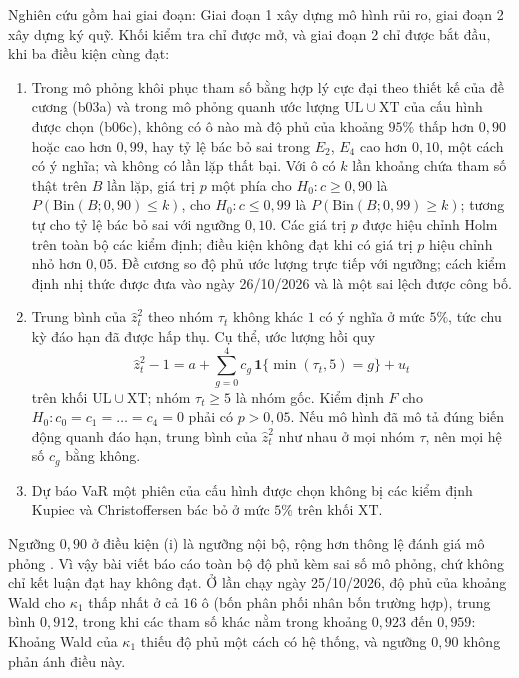 \documentclass[12pt,a4paper]{article}
\theoremstyle{definition}
\theoremstyle{remark}
\newcommand{\ind}{\mathbf{1}}
\newcommand{\UL}{\mathrm{UL}}
\newcommand{\XT}{\mathrm{XT}}
\begin{document}
Nghiên cứu gồm hai giai đoạn: Giai đoạn 1 xây dựng mô hình rủi ro, giai đoạn 2 xây dựng ký quỹ. Khối kiểm tra chỉ được mở, và giai đoạn 2 chỉ được bắt đầu, khi ba điều kiện cùng đạt:
\begin{enumerate}
\item[(i)] Trong mô phỏng khôi phục tham số bằng hợp lý cực đại theo thiết kế của đề cương (b03a) và trong mô phỏng quanh ước lượng $\UL\cup\XT$ của cấu hình được chọn (b06c), không có ô nào mà độ phủ của khoảng $95\%$ thấp hơn $0{,}90$ hoặc cao hơn $0{,}99$, hay tỷ lệ bác bỏ sai trong $E_2$, $E_4$ cao hơn $0{,}10$, một cách có ý nghĩa; và không có lần lặp thất bại. Với ô có $k$ lần khoảng chứa tham số thật trên $B$ lần lặp, giá trị $p$ một phía cho $H_0:c\ge0{,}90$ là $P(\mathrm{Bin}(B;0{,}90)\le k)$, cho $H_0:c\le0{,}99$ là $P(\mathrm{Bin}(B;0{,}99)\ge k)$; tương tự cho tỷ lệ bác bỏ sai với ngưỡng $0{,}10$. Các giá trị $p$ được hiệu chỉnh Holm trên toàn bộ các kiểm định; điều kiện không đạt khi có giá trị $p$ hiệu chỉnh nhỏ hơn $0{,}05$. Đề cương so độ phủ ước lượng trực tiếp với ngưỡng; cách kiểm định nhị thức được đưa vào ngày 26/10/2026 và là một sai lệch được công bố.
\item[(ii)] Trung bình của $\hat z_t^2$ theo nhóm $\tau_t$ không khác $1$ có ý nghĩa ở mức $5\%$, tức chu kỳ đáo hạn đã được hấp thụ. Cụ thể, ước lượng hồi quy
\begin{equation*}
\hat z_t^2-1=a+\sum_{g=0}^{4}c_g\,\ind\{\min(\tau_t,5)=g\}+u_t
\end{equation*}
trên khối $\UL\cup\XT$; nhóm $\tau_t\ge5$ là nhóm gốc. Kiểm định $F$ cho $H_0:c_0=c_1=\dots=c_4=0$ phải có $p>0{,}05$. Nếu mô hình đã mô tả đúng biến động quanh đáo hạn, trung bình của $\hat z_t^2$ như nhau ở mọi nhóm $\tau$, nên mọi hệ số $c_g$ bằng không.
\item[(iii)] Dự báo VaR một phiên của cấu hình được chọn không bị các kiểm định Kupiec và Christoffersen bác bỏ ở mức $5\%$ trên khối $\XT$.
\end{enumerate}
Ngưỡng $0{,}90$ ở điều kiện (i) là ngưỡng nội bộ, rộng hơn thông lệ đánh giá mô phỏng \cite{morris2019}. Vì vậy bài viết báo cáo toàn bộ độ phủ kèm sai số mô phỏng, chứ không chỉ kết luận đạt hay không đạt. Ở lần chạy ngày 25/10/2026, độ phủ của khoảng Wald cho $\kappa_1$ thấp nhất ở cả $16$ ô (bốn phân phối nhân bốn trường hợp), trung bình $0{,}912$, trong khi các tham số khác nằm trong khoảng $0{,}923$ đến $0{,}959$: Khoảng Wald của $\kappa_1$ thiếu độ phủ một cách có hệ thống, và ngưỡng $0{,}90$ không phản ánh điều này.
\end{document}
